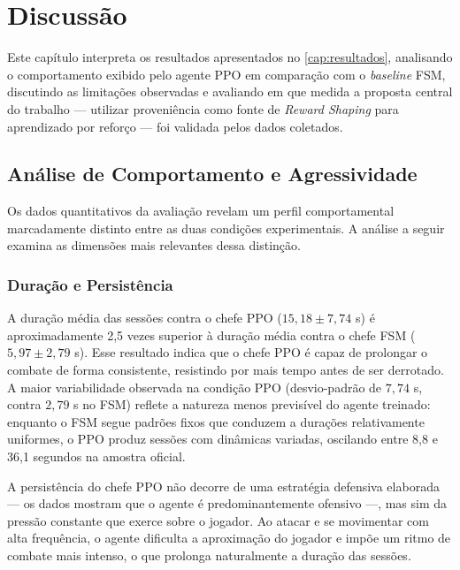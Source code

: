 \chapter{Discussão}
\label{cap:discussao}

Este capítulo interpreta os resultados apresentados no
\autoref{cap:resultados}, analisando o comportamento exibido pelo agente PPO
em comparação com o \textit{baseline} FSM, discutindo as limitações
observadas e avaliando em que medida a proposta central do trabalho ---
utilizar proveniência como fonte de \textit{Reward Shaping} para aprendizado
por reforço --- foi validada pelos dados coletados.

\section{Análise de Comportamento e Agressividade}
\label{sec:analise-comportamento}

Os dados quantitativos da avaliação revelam um perfil comportamental
marcadamente distinto entre as duas condições experimentais. A análise a
seguir examina as dimensões mais relevantes dessa distinção.

\subsection{Duração e Persistência}
\label{subsec:duracao-persistencia}

A duração média das sessões contra o chefe PPO ($15{,}18 \pm 7{,}74$ s) é
aproximadamente 2,5 vezes superior à duração média contra o chefe FSM
($5{,}97 \pm 2{,}79$ s). Esse resultado indica que o chefe PPO é capaz de
prolongar o combate de forma consistente, resistindo por mais tempo antes de
ser derrotado. A maior variabilidade observada na condição PPO (desvio-padrão
de $7{,}74$ s, contra $2{,}79$ s no FSM) reflete a natureza menos previsível
do agente treinado: enquanto o FSM segue padrões fixos que conduzem a durações
relativamente uniformes, o PPO produz sessões com dinâmicas variadas, oscilando
entre 8,8 e 36,1 segundos na amostra oficial.

A persistência do chefe PPO não decorre de uma estratégia defensiva
elaborada --- os dados mostram que o agente é predominantemente ofensivo ---,
mas sim da pressão constante que exerce sobre o jogador. Ao atacar e se
movimentar com alta frequência, o agente dificulta a aproximação do jogador
e impõe um ritmo de combate mais intenso, o que prolonga naturalmente a
duração das sessões.

